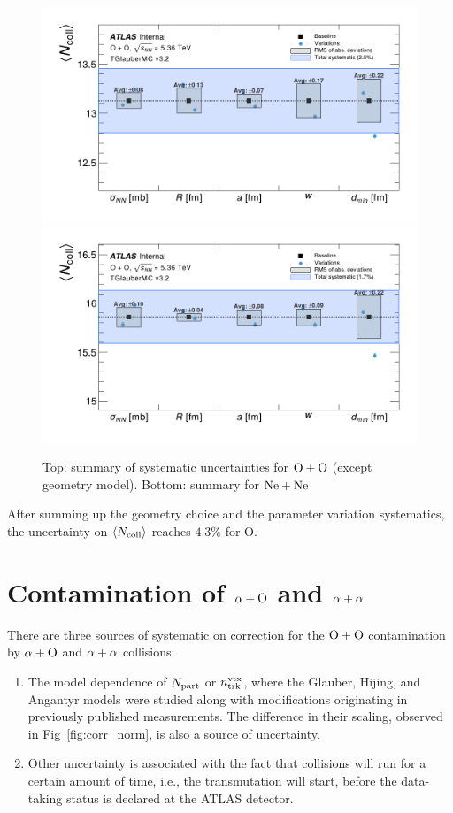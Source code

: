 \begin{figure}[h]
    \centering
    \includegraphics[width=0.8\linewidth]{images/ncoll_sensitivity_OO.png}
    \includegraphics[width=0.8\linewidth]{images/ncoll_sensitivity_NeNe.png}
    \caption{Top: summary of systematic uncertainties for $\OO$ (except geometry model). Bottom: summary for $\NeNe$}
    \label{fig:systematics_ncoll_oo_nene}
\end{figure}
After summing up the geometry choice and the parameter variation systematics, the uncertainty on $\langle N_{\text{coll}}\rangle$ reaches $4.3\%$ for O.

\section{Contamination of $\Oa$ and $\alal$}
There are three sources of systematic on correction for the $\OO$ contamination by $\Oa$ and $\alal$ collisions:
\begin{enumerate}
    \item The model dependence of $N_{\text{part}}$ or $n_\text{trk}^\text{vtx}$, where the Glauber, Hijing, and Angantyr models were studied along with modifications originating in previously published measurements. The difference in their scaling, observed in Fig~\ref{fig:corr_norm}, is also a source of uncertainty. 
    \item Other uncertainty is associated with the fact that collisions will run for a certain amount of time, i.e., the transmutation will start, before the data-taking status is declared at the ATLAS detector.
\end{enumerate}


